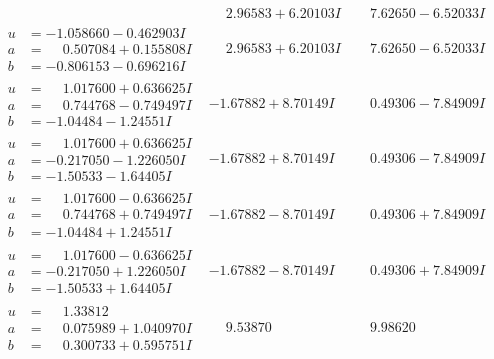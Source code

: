 \documentclass[1p]{elsarticle_modified}
\theoremstyle{definition}
\begin{document}
$$\begin{array}{c|c|c}
 & \phantom{-}2.96583 + 6.20103 I & \phantom{-}7.62650 - 6.52033 I \\ \hline\begin{aligned}
u &= -1.058660 - 0.462903 I \\
a &= \phantom{-}0.507084 + 0.155808 I \\
b &= -0.806153 - 0.696216 I\end{aligned}
 & \phantom{-}2.96583 + 6.20103 I & \phantom{-}7.62650 - 6.52033 I \\ \hline\begin{aligned}
u &= \phantom{-}1.017600 + 0.636625 I \\
a &= \phantom{-}0.744768 - 0.749497 I \\
b &= -1.04484 - 1.24551 I\end{aligned}
 & -1.67882 + 8.70149 I & \phantom{-}0.49306 - 7.84909 I \\ \hline\begin{aligned}
u &= \phantom{-}1.017600 + 0.636625 I \\
a &= -0.217050 - 1.226050 I \\
b &= -1.50533 - 1.64405 I\end{aligned}
 & -1.67882 + 8.70149 I & \phantom{-}0.49306 - 7.84909 I \\ \hline\begin{aligned}
u &= \phantom{-}1.017600 - 0.636625 I \\
a &= \phantom{-}0.744768 + 0.749497 I \\
b &= -1.04484 + 1.24551 I\end{aligned}
 & -1.67882 - 8.70149 I & \phantom{-}0.49306 + 7.84909 I \\ \hline\begin{aligned}
u &= \phantom{-}1.017600 - 0.636625 I \\
a &= -0.217050 + 1.226050 I \\
b &= -1.50533 + 1.64405 I\end{aligned}
 & -1.67882 - 8.70149 I & \phantom{-}0.49306 + 7.84909 I \\ \hline\begin{aligned}
u &= \phantom{-}1.33812\phantom{ +0.000000I} \\
a &= \phantom{-}0.075989 + 1.040970 I \\
b &= \phantom{-}0.300733 + 0.595751 I\end{aligned}
 & \phantom{-}9.53870\phantom{ +0.000000I} & \phantom{-}9.98620\phantom{ +0.000000I} \\ \hline\begin{aligned}

\end{aligned}
\end{array}$$
\end{document}
